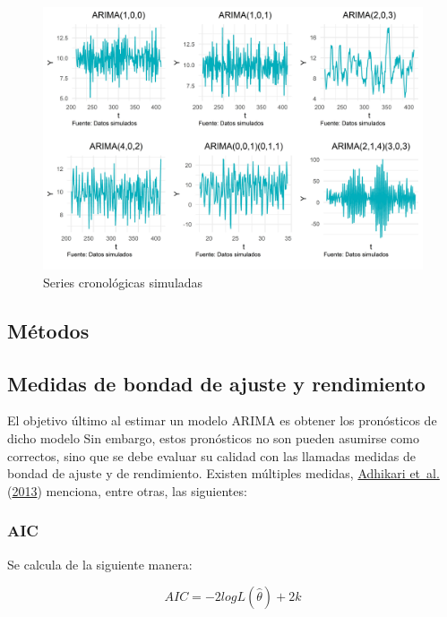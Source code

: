 \documentclass[
]{article}
\begin{document}
\begin{figure}[!h]
\includegraphics[width=1\linewidth,height=1\textheight]{Tesis_files/figure-latex/series_simuladas-1} \caption{Series cronológicas simuladas}\label{fig:series_simuladas}
\end{figure}

\subsection{Métodos}

\subsection{Medidas de bondad de ajuste y rendimiento}

El objetivo último al estimar un modelo ARIMA es obtener los pronósticos
de dicho modelo Sin embargo, estos pronósticos no son pueden asumirse
como correctos, sino que se debe evaluar su calidad con las llamadas
medidas de bondad de ajuste y de rendimiento. Existen múltiples medidas,
\protect\hyperlink{ref-medidas}{Adhikari et~al.}
(\protect\hyperlink{ref-medidas}{2013}) menciona, entre otras, las
siguientes:

\subsubsection{AIC}

Se calcula de la siguiente manera:

\begin{equation}
\label{eqn:AIC}
AIC=-2logL\left(\hat\theta\right)+2k
\end{equation}
\end{document}

